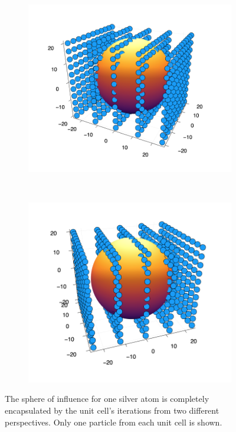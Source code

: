 \begin{figure}
  \begin{subfigure}{0.47\textwidth}
    \includegraphics[width=\linewidth]{Figures/iteratedUnitCell}
    \label{iteratedUnitCellFirst}
  \end{subfigure}%
  \\
  \begin{subfigure}{0.45\textwidth}
    \includegraphics[width=\linewidth]{Figures/iteratedUnitCell2}
    \label{iteratedUnitCellSecond}
  \end{subfigure}%

\caption{The sphere of influence for one silver atom is completely encapsulated by the unit cell's iterations from two different perspectives. Only one particle from each unit cell is shown.} \label{iteratedUnitCells}
\end{figure}


